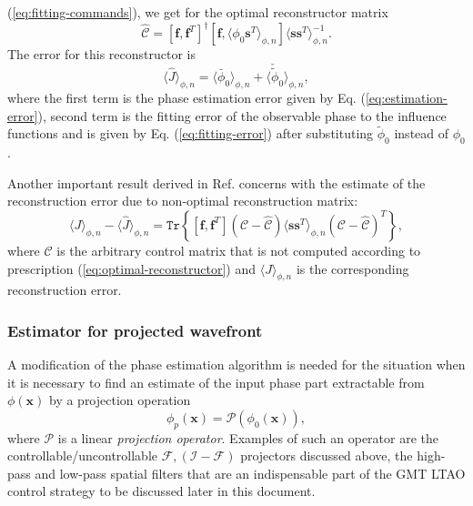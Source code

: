 (\ref{eq:fitting-commands}), we get for the optimal reconstructor matrix
\begin{equation} \label{eq:optimal-reconstructor}
	\hat{\mathcal{C}} = [\bm{f},\bm{f}^{T}]^{\dagger}
	                    [\bm{f}, \langle \phi_{0} \bm{s}^{T} \rangle_{\phi,n} ]
	                    \langle \bm{s} \bm{s}^{T} \rangle_{\phi,n}^{-1}.
\end{equation}
The error for this reconstructor is
\begin{equation} \label{eq:reconstruction-error}
	\langle \hat{J} \rangle_{\phi,n} =
	\langle \bar{\phi}_{0} \rangle_{\phi,n} +
	\langle \check{\tilde{\phi}}_{0} \rangle_{\phi,n},
\end{equation}
where the first term is the phase estimation error given by Eq.
(\ref{eq:estimation-error}), second term is the fitting error of the
observable phase to the influence functions and is given by Eq.
(\ref{eq:fitting-error}) after substituting $\tilde{\phi}_{0}$ instead of
$\phi_{0}$.

Another important result derived in Ref. \cite{WibergMaxGavel2} concerns with
the estimate of the reconstruction error due to non-optimal reconstruction
matrix:
\begin{equation} \label{eq:non-optimal-reconstruction-error}
	\langle J \rangle_{\phi,n} - \langle \hat{J} \rangle_{\phi,n} =
	\texttt{Tr} \left\{
	[\bm{f},\bm{f}^{T}]
	( \mathcal{C} - \hat{\mathcal{C}} )
	\langle \bm{s} \bm{s}^{T} \rangle_{\phi,n}
	( \mathcal{C} - \hat{\mathcal{C}} )^{T} \right\},
\end{equation}
where $\mathcal{C}$ is the arbitrary control matrix that is not computed
according to prescription (\ref{eq:optimal-reconstructor}) and
$\langle J \rangle_{\phi,n}$ is the corresponding reconstruction error.

\subsubsection{Estimator for projected wavefront}

A modification of the phase estimation algorithm is needed for the situation
when it is necessary to find an estimate of the input phase part extractable
from $\phi(\bm{x})$ by a projection operation
\begin{equation} \label{eq:projection}
	\phi_{p}(\bm{x}) = \mathcal{P} ( \phi_{0} (\bm{x}) ),
\end{equation}
where $\mathcal{P}$ is a linear \emph{projection operator}.  Examples of such an operator are the controllable/uncontrollable
$\mathcal{F,(I-F)}$
projectors discussed above, the high-pass and low-pass spatial filters that
are an indispensable part of the GMT LTAO control strategy to be discussed
later in this document.

